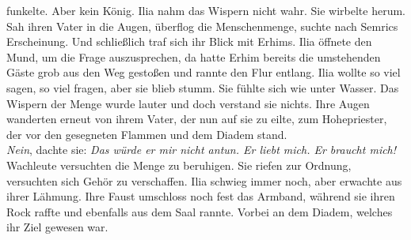funkelte. Aber kein König.
Ilia nahm das Wispern nicht wahr. Sie wirbelte herum. Sah ihren Vater in die Augen, überflog die 
Menschenmenge, suchte nach Semrics Erscheinung. Und schließlich traf sich ihr Blick mit Erhims. Ilia 
öffnete den Mund, um die Frage auszusprechen, da hatte Erhim bereits die umstehenden Gäste grob aus 
den Weg gestoßen und rannte den Flur entlang. Ilia wollte so viel sagen, so viel fragen, aber sie 
blieb stumm. Sie fühlte sich wie unter Wasser. Das Wispern der Menge wurde lauter und doch verstand 
sie nichts. Ihre Augen wanderten erneut von ihrem Vater, der nun auf sie zu eilte, zum Hohepriester, 
der vor den gesegneten Flammen und dem Diadem stand. \\
\textit{Nein}, dachte sie: \textit{Das würde er mir nicht antun. Er liebt mich. Er braucht mich!}\\
Wachleute versuchten die Menge zu beruhigen. Sie riefen zur Ordnung, versuchten sich Gehör zu 
verschaffen. Ilia schwieg immer noch, aber erwachte aus ihrer Lähmung. Ihre Faust umschloss 
noch fest das Armband, während sie ihren Rock raffte und ebenfalls aus dem Saal rannte. Vorbei an 
dem Diadem, welches ihr Ziel gewesen war.\\

